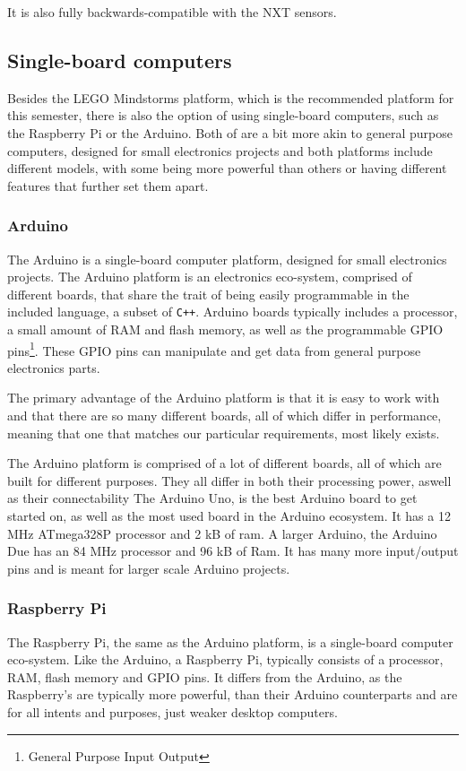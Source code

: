 It is also fully backwards-compatible with the NXT sensors\cite{ev3nxtcompatability}.

\subsection{Single-board computers}
Besides the LEGO Mindstorms platform, which is the recommended platform for this semester, there is also the option of using single-board computers, such as the Raspberry Pi or the Arduino.
Both of are a bit more akin to general purpose computers, designed for small electronics projects and both platforms include different models, with some being more powerful than others or having different features that further set them apart.

\subsubsection{Arduino}
The Arduino is a single-board computer platform, designed for small electronics projects.
The Arduino platform is an electronics eco-system, comprised of different boards, that share the trait of being easily programmable in the included language, a subset of \texttt{C++}.
Arduino boards typically includes a processor, a small amount of RAM and flash memory, as well as the programmable GPIO pins\footnote{General Purpose Input Output}.
These GPIO pins can manipulate and get data from general purpose electronics parts.

The primary advantage of the Arduino platform is that it is easy to work with and that there are so many different boards, all of which differ in performance, meaning that one that matches our particular requirements, most likely exists.

The Arduino platform is comprised of a lot of different boards, all of which are built for different purposes.
They all differ in both their processing power, aswell as their connectability
The Arduino Uno, is the best Arduino board to get started on, as well as the most used board in the Arduino ecosystem\cite{ArduinoUno3}.
It has a 12 MHz ATmega328P processor and 2 kB of ram.
A larger Arduino, the Arduino Due has an 84 MHz processor and 96 kB of Ram\cite{ArduinoDue}.
It has many more input/output pins and is meant for larger scale Arduino projects.

\subsubsection{Raspberry Pi}
The Raspberry Pi, the same as the Arduino platform, is a single-board computer eco-system.
Like the Arduino, a Raspberry Pi, typically consists of a processor, RAM, flash memory and GPIO pins.
It differs from the Arduino, as the Raspberry's are typically more powerful, than their Arduino counterparts and are for all intents and purposes, just weaker desktop computers.

